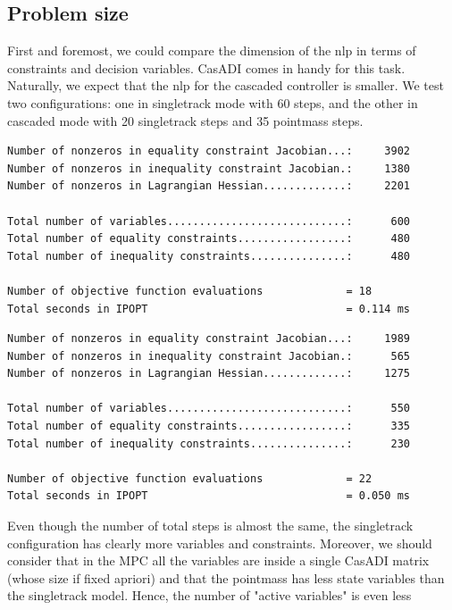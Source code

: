 \documentclass[a4paper, onecolumn, 12pt]{article}
\begin{document}
\subsection{Problem size}
First and foremost, we could compare the dimension of the nlp in terms of
constraints and decision variables. CasADI comes in handy for this task.
Naturally, we expect that the nlp for the cascaded controller is smaller. We
test two configurations: one in singletrack mode with 60 steps, and the other in
cascaded mode with 20 singletrack steps and 35 pointmass steps. \\
\begin{Verbatim}[frame=single,label=Singletrack with 60 steps,labelposition=topline,framesep=10pt]
Number of nonzeros in equality constraint Jacobian...:     3902
Number of nonzeros in inequality constraint Jacobian.:     1380
Number of nonzeros in Lagrangian Hessian.............:     2201

Total number of variables............................:      600
Total number of equality constraints.................:      480
Total number of inequality constraints...............:      480

Number of objective function evaluations             = 18
Total seconds in IPOPT                               = 0.114 ms
\end{Verbatim} 
\vspace{1mm}
\begin{Verbatim}[frame=single,label=Cascaded with 20+35 steps,labelposition=topline,framesep=10pt]
Number of nonzeros in equality constraint Jacobian...:     1989
Number of nonzeros in inequality constraint Jacobian.:      565
Number of nonzeros in Lagrangian Hessian.............:     1275

Total number of variables............................:      550
Total number of equality constraints.................:      335
Total number of inequality constraints...............:      230

Number of objective function evaluations             = 22
Total seconds in IPOPT                               = 0.050 ms
\end{Verbatim}
Even though the number of total steps is almost the same, the singletrack
configuration has clearly more variables and constraints. Moreover, we should
consider that in the MPC all the variables are inside a single CasADI matrix
(whose size if fixed apriori) and that the pointmass has less state variables
than the singletrack model. Hence, the number of "active variables" is even less
\end{document}
